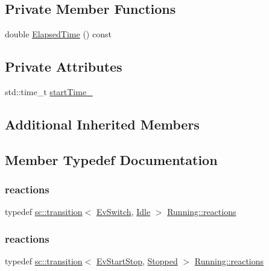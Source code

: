 \subsection*{Private Member Functions}
\begin{DoxyCompactItemize}
\item 
double \mbox{\hyperlink{struct_running_a5320a8463f61e5ab96008bc218bb9f68}{Elapsed\+Time}} () const
\end{DoxyCompactItemize}
\subsection*{Private Attributes}
\begin{DoxyCompactItemize}
\item 
std\+::time\+\_\+t \mbox{\hyperlink{struct_running_ae8dcc437642cde76fb5f317657e59222}{start\+Time\+\_\+}}
\end{DoxyCompactItemize}
\subsection*{Additional Inherited Members}


\subsection{Member Typedef Documentation}
\mbox{\label{struct_running_af4d01d2d6379e26b9397780725578356}} 
\subsubsection{\texorpdfstring{reactions}{reactions}\hspace{0.1cm}{\footnotesize\ttfamily [1/3]}}
{\footnotesize\ttfamily typedef \mbox{\hyperlink{classboost_1_1statechart_1_1transition}{sc\+::transition}}$<$ \mbox{\hyperlink{struct_ev_switch}{Ev\+Switch}}, \mbox{\hyperlink{struct_idle}{Idle}} $>$ \mbox{\hyperlink{struct_running_a9c7d824351006514acf617bd07f2d222}{Running\+::reactions}}}

\mbox{\label{struct_running_a9c7d824351006514acf617bd07f2d222}} 
\subsubsection{\texorpdfstring{reactions}{reactions}\hspace{0.1cm}{\footnotesize\ttfamily [2/3]}}
{\footnotesize\ttfamily typedef \mbox{\hyperlink{classboost_1_1statechart_1_1transition}{sc\+::transition}}$<$ \mbox{\hyperlink{struct_ev_start_stop}{Ev\+Start\+Stop}}, \mbox{\hyperlink{struct_stopped}{Stopped}} $>$ \mbox{\hyperlink{struct_running_a9c7d824351006514acf617bd07f2d222}{Running\+::reactions}}}

